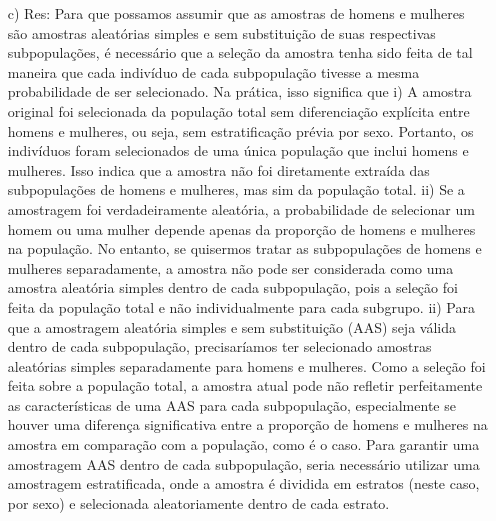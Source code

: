 \documentclass[a4paper,12pt,oneside,twocolumn]{Config/milktest}
\begin{document}
{\begin{itemize}
    \item[c) Res:] Para que possamos assumir que as amostras de homens e mulheres são amostras aleatórias simples e sem substituição de suas respectivas subpopulações, é necessário que a seleção da amostra tenha sido feita de tal maneira que cada indivíduo de cada subpopulação tivesse a mesma probabilidade de ser selecionado. Na prática, isso significa que i) A amostra original foi selecionada da população total sem diferenciação explícita entre homens e mulheres, ou seja, sem estratificação prévia por sexo. Portanto, os indivíduos foram selecionados de uma única população que inclui homens e mulheres. Isso indica que a amostra não foi diretamente extraída das subpopulações de homens e mulheres, mas sim da população total. ii) Se a amostragem foi verdadeiramente aleatória, a probabilidade de selecionar um homem ou uma mulher depende apenas da proporção de homens e mulheres na população. No entanto, se quisermos tratar as subpopulações de homens e mulheres separadamente, a amostra não pode ser considerada como uma amostra aleatória simples dentro de cada subpopulação, pois a seleção foi feita da população total e não individualmente para cada subgrupo. ii) Para que a amostragem aleatória simples e sem substituição (AAS) seja válida dentro de cada subpopulação, precisaríamos ter selecionado amostras aleatórias simples separadamente para homens e mulheres. Como a seleção foi feita sobre a população total, a amostra atual pode não refletir perfeitamente as características de uma AAS para cada subpopulação, especialmente se houver uma diferença significativa entre a proporção de homens e mulheres na amostra em comparação com a população,  como é o caso. Para garantir uma amostragem AAS dentro de cada subpopulação, seria necessário utilizar uma amostragem estratificada, onde a amostra é dividida em estratos (neste caso, por sexo) e selecionada aleatoriamente dentro de cada estrato.


\end{itemize}}
\end{document}
